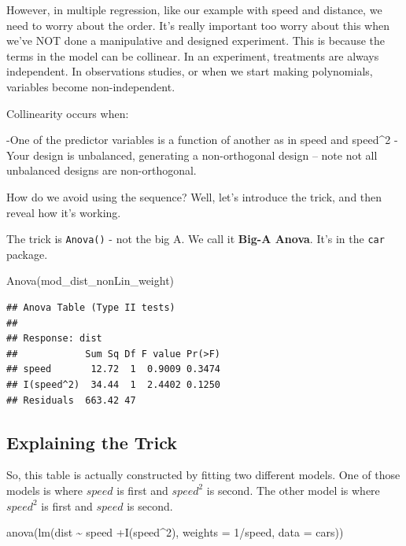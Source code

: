 \documentclass[
]{book}
\newenvironment{Shaded}{\begin{snugshade}}{\end{snugshade}}
\newcommand{\AttributeTok}[1]{\textcolor[rgb]{0.77,0.63,0.00}{#1}}
\newcommand{\DecValTok}[1]{\textcolor[rgb]{0.00,0.00,0.81}{#1}}
\newcommand{\FunctionTok}[1]{\textcolor[rgb]{0.00,0.00,0.00}{#1}}
\newcommand{\NormalTok}[1]{#1}
\newcommand{\SpecialCharTok}[1]{\textcolor[rgb]{0.00,0.00,0.00}{#1}}
\begin{document}
However, in multiple regression, like our example with speed and distance, we need to worry about the order. It's really important too worry about this when we've NOT done a manipulative and designed experiment. This is because the terms in the model can be collinear. In an experiment, treatments are always independent. In observations studies, or when we start making polynomials, variables become non-independent.

Collinearity occurs when:

-One of the predictor variables is a function of another as in speed and speed\^{}2
-Your design is unbalanced, generating a non-orthogonal design -- note not all unbalanced designs are non-orthogonal.

How do we avoid using the sequence? Well, let's introduce the trick, and then reveal how it's working.

The trick is \texttt{Anova()} - not the big A. We call it \textbf{Big-A Anova}. It's in the \texttt{car} package.

\begin{Shaded}
\begin{Highlighting}[]
\FunctionTok{Anova}\NormalTok{(mod\_dist\_nonLin\_weight)}
\end{Highlighting}
\end{Shaded}

\begin{verbatim}
## Anova Table (Type II tests)
## 
## Response: dist
##            Sum Sq Df F value Pr(>F)
## speed       12.72  1  0.9009 0.3474
## I(speed^2)  34.44  1  2.4402 0.1250
## Residuals  663.42 47
\end{verbatim}

\hypertarget{explaining-the-trick}{%
\subsection{Explaining the Trick}\label{explaining-the-trick}}

So, this table is actually constructed by fitting two different models. One of those models is where \(speed\) is first and \(speed^{2}\) is second. The other model is where \(speed^{2}\) is first and \(speed\) is second.

\begin{Shaded}
\begin{Highlighting}[]
\FunctionTok{anova}\NormalTok{(}\FunctionTok{lm}\NormalTok{(dist }\SpecialCharTok{\textasciitilde{}}\NormalTok{ speed }\SpecialCharTok{+}\FunctionTok{I}\NormalTok{(speed}\SpecialCharTok{\^{}}\DecValTok{2}\NormalTok{), }\AttributeTok{weights =} \DecValTok{1}\SpecialCharTok{/}\NormalTok{speed, }\AttributeTok{data =}\NormalTok{ cars))}
\end{Highlighting}
\end{Shaded}
\end{document}
